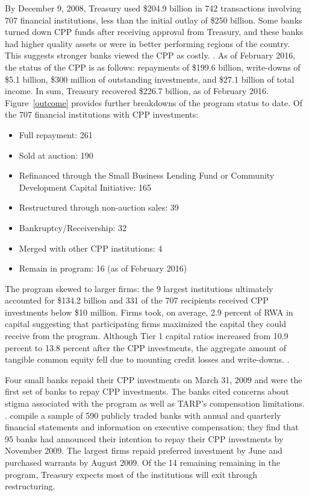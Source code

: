 \documentclass[12pt]{article}
\begin{document}
By December 9, 2008, Treasury used \$204.9 billion in 742 transactions involving 707 financial institutions, less than the initial outlay of \$250 billion. Some banks turned down CPP funds after receiving approval from Treasury, and these banks had higher quality assets or were in better performing regions of the country. This suggests stronger banks viewed the CPP as costly. \citep{Ba}. As of February 2016, the status of the CPP is as follows: repayments of \$199.6 billion, write-downs of \$5.1 billion, \$300 million of outstanding investments, and \$27.1 billion of total income. In sum, Treasury recovered \$226.7 billion, as of February 2016. Figure~\ref{outcome} provides further breakdowns of the program status to date. Of the 707 financial institutions with CPP investments: 
\begin{itemize}[label={--}]
\item Full repayment: 261 
\item Sold at auction: 190 
\item Refinanced through the Small Business Lending Fund or Community Development Capital Initiative: 165 
\item Restructured through non-auction sales: 39 
\item Bankruptcy/Receivership: 32 
\item Merged with other CPP institutions: 4
\item Remain in program: 16 (as of February 2016)
\end{itemize}
\citep{GAO}
The program skewed to larger firms: the 9 largest institutions ultimately accounted for \$134.2 billion and 331 of the 707 recipients received CPP investments below \$10 million. Firms took, on average, 2.9 percent of RWA in capital suggesting that participating firms maximized the capital they could receive from the program. Although Tier 1 capital ratios increased from 10.9 percent to 13.8 percent after the CPP investments, the aggregate amount of tangible common equity fell due to mounting credit losses and write-downs. \citep{Ba}. 

Four small banks repaid their CPP investments on March 31, 2009 and were the first set of banks to repay CPP investments. The banks cited concerns about stigma associated with the program as well as TARP's compensation limitations. \citep{SmallRepay}. \citet{Ba} compile a sample of 590 publicly traded banks with annual and quarterly financial statements and information on executive compensation; they find that 95 banks had announced their intention to repay their CPP investments by November 2009. The largest firms repaid preferred investment by June and purchased warrants by August 2009. Of the 14 remaining remaining in the program, Treasury expects most of the institutions will exit through restructuring. 
\end{document}
